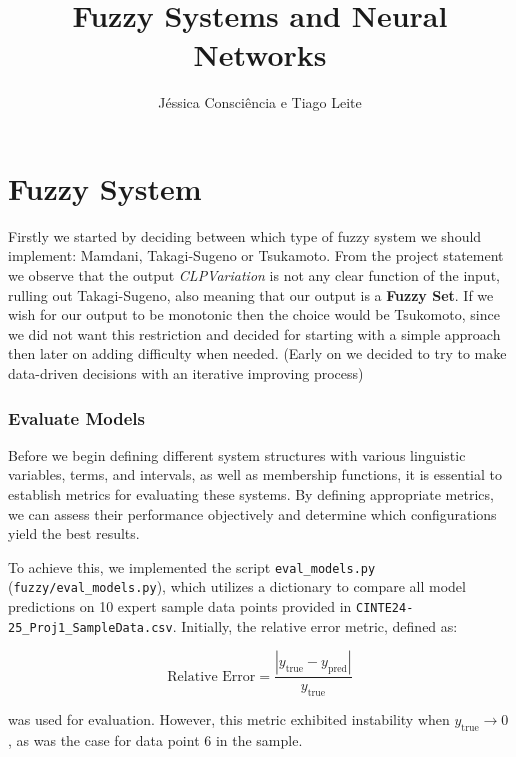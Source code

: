 \documentclass[titlepage]{article}
\title{Fuzzy Systems and Neural Networks}
\author{Jéssica Consciência e Tiago Leite}
\begin{document}
\maketitle
\newpage


\part{Fuzzy System}

Firstly we started by deciding between which type of fuzzy system
we should implement: Mamdani, Takagi-Sugeno or Tsukamoto.
From the project statement we observe that the output \textit{CLPVariation}
is not any clear function of the input, rulling out Takagi-Sugeno,
also meaning that our output is a \textbf{Fuzzy Set}. If we wish for
our output to be monotonic then the choice would be Tsukomoto, since
we did not want this restriction and decided for starting with a simple
approach then later on adding difficulty when needed.
(Early on we decided to try to make data-driven decisions with an iterative
improving process)

\section{Evaluate Models}

Before we begin defining different system structures with various linguistic variables, terms, and intervals, as well as membership functions, it is essential to establish metrics for evaluating these systems.
By defining appropriate metrics, we can assess their performance objectively and determine which configurations yield the best results.

To achieve this, we implemented the script \newline \texttt{eval\_models.py} (\texttt{fuzzy/eval\_models.py}),
which utilizes a dictionary to compare all model predictions on 10 expert sample data points provided in \texttt{CINTE24-25\_Proj1\_SampleData.csv}.
Initially, the relative error metric, defined as:

\[
    \text{Relative Error} = \frac{|y_{\text{true}} - y_{\text{pred}}|}{y_{\text{true}}}
\]

was used for evaluation.
However, this metric exhibited instability when $y_{\text{true}} \to 0$, as was the case for data point 6 in the sample.

\end{document}
